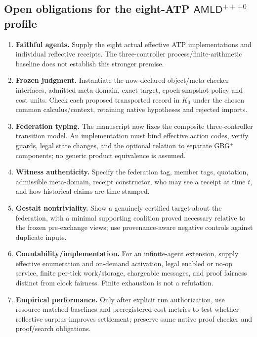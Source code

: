 \documentclass[10pt,letterpaper]{article}
\theoremstyle{remark}\newtheorem{remark}[definition]{Remark}
\newcommand{\AMLD}{\mathsf{AMLD}}
\begin{document}
\subsection{Open obligations for the eight-ATP $\AMLD^{+++0}$ profile}
\begin{enumerate}
\item \textbf{Faithful agents.} Supply the eight actual effective ATP implementations and individual reflective receipts. The three-controller process/finite-arithmetic baseline does not establish this stronger premise.
\item \textbf{Frozen judgment.} Instantiate the now-declared object/meta checker interfaces, admitted meta-domain, exact target, epoch-snapshot policy and cost units. Check each proposed transported record in $K_0$ under the chosen common calculus/context, retaining native hypotheses and rejected imports.
\item \textbf{Federation typing.} The manuscript now fixes the composite three-controller transition model. An implementation must bind effective action codes, verify guards, legal state changes, and the optional relation to separate GBG$^+$ components; no generic product equivalence is assumed.
\item \textbf{Witness authenticity.} Specify the federation tag, member tags, quotation, admissible meta-domain, receipt constructor, who may see a receipt at time $t$, and how historical claims are time stamped.
\item \textbf{Gestalt nontriviality.} Show a genuinely certified target about the federation, with a minimal supporting coalition proved necessary relative to the frozen pre-exchange views; use provenance-aware negative controls against duplicate inputs.
\item \textbf{Countability/implementation.} For an infinite-agent extension, supply effective enumeration and on-demand activation, legal enabled or no-op service, finite per-tick work/storage, chargeable messages, and proof fairness distinct from clock fairness. Finite exhaustion is not a refutation.
\item \textbf{Empirical performance.} Only after explicit run authorization, use resource-matched baselines and preregistered cost metrics to test whether reflective surplus improves settlement; preserve same native proof checker and proof/search obligations.
\end{enumerate}
\end{document}
